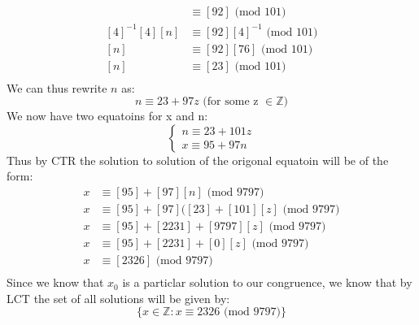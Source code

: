 \documentclass[11pt]{article}
\begin{document}
\begin{align*}
  [4][n] & \equiv [92]  \text{  (mod 101)} \\
  [4]^{-1}[4][n] & \equiv [92][4]^{-1}  \text{  (mod 101)} \\
  [n]  & \equiv [92][76]  \text{  (mod 101)} \\
  [n] & \equiv [23]   \text{  (mod 101)} \\
\end{align*}
We can thus rewrite $n$ as:
\[ n \equiv 23 + 97z  \text {  (for some z $\in \mathbb{Z}$)} \]
We now have two equatoins for x and n:
$$
\begin{cases}
 n \equiv 23 + 101z\\
 x \equiv 95 + 97n
\end{cases}
$$
Thus by CTR the solution to solution of the origonal equatoin will be of the form:
\begin{align*}
   x & \equiv [95] + [97][n] \text{  (mod 9797)}  \\
   x & \equiv  [95] + [97]([23]+ [101][z]\text{  (mod 9797)}  \\
   x & \equiv  [95] + [2231]+ [9797][z]\text{  (mod 9797)}  \\
   x & \equiv  [95] + [2231]+ [0][z]\text{  (mod 9797)}  \\
   x & \equiv  [2326] \text{  (mod 9797)}  \\
\end{align*}
Since we know that $x_0$ is a particlar solution to our congruence, we know that by LCT the set of all solutions will be given by:
\[  \{ x \in \mathbb{Z} : x \equiv 2326 \text{  (mod 9797)} \} \]
\end{document}

